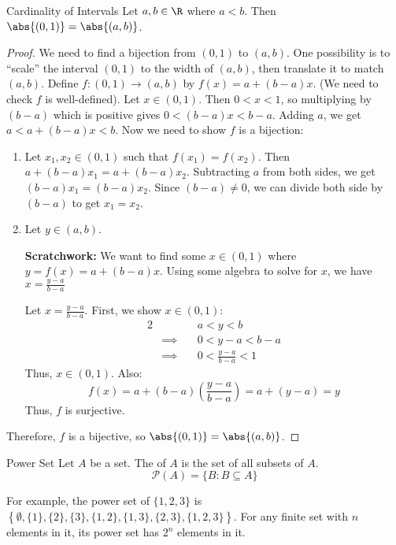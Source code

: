 \begin{exbox}{Cardinality of Intervals}{}
    Let $a,b \in \R$ where $a < b$. Then $\abs{(0,1)} = \abs{(a,b)}$.
    \tcblower
    \begin{proof}
        We need to find a bijection from $(0,1)$ to $(a,b)$. One possibility is to ``scale'' the interval $(0,1)$ to the width of $(a,b)$, then translate it to match $(a,b)$. Define $f : (0,1) \to (a,b)$ by $f(x) = a + (b-a)x$. (We need to check $f$ is well-defined). Let $x \in (0,1)$. Then $0<x<1$, so multiplying by $(b-a)$ which is positive gives $0 < (b-a)x < b-a$. Adding $a$, we get $a < a+(b-a)x < b$. Now we need to show $f$ is a bijection:
        \begin{enumerate}
            \item Let $x_1, x_2 \in (0,1)$ such that $f(x_1) = f(x_2)$. Then $a + (b-a)x_1 = a+ (b-a)x_2$. Subtracting $a$ from both sides, we get $(b-a)x_1 = (b-a)x_2$. Since $(b-a) \neq 0$, we can divide both side by $(b-a)$ to get $x_1 = x_2$.
            \item Let $y \in (a,b)$.
            \begin{notebox}
                \textbf{Scratchwork:} We want to find some $x \in (0,1)$ where $y = f(x) = a + (b-a)x$. Using some algebra to solve for $x$, we have $x = \frac{y-a}{b-a}$
            \end{notebox}
            Let $x = \frac{y-a}{b-a}$. First, we show $x \in (0,1)$:
            \begin{alignat*}{2}
                && a < y < b \\
                & \implies \quad & 0 < y-a < b-a \\
                & \implies & 0 < \frac{y-a}{b-a} < 1
            \end{alignat*}
            Thus, $x \in (0,1)$. Also:
            \[ f(x) = a + (b-a) \left( \frac{y-a}{b-a} \right) = a + (y-a) = y \]
            Thus, $f$ is surjective.
        \end{enumerate}
        Therefore, $f$ is a bijective, so $\abs{(0,1)} = \abs{(a,b)}$.
    \end{proof}
\end{exbox}

\begin{dfnbox}{Power Set}{}
    Let $A$ be a set. The  of $A$ is the set of all subsets of $A$.
    \tcblower
    \[ \mathcal{P}(A) = \{ B : B \subseteq A \} \]
\end{dfnbox}

For example, the power set of $\{1,2,3\}$ is $\left\{\emptyset, \{1\}, \{2\}, \{3\}, \{1,2\}, \{1,3\}, \{2,3\}, \{1,2,3\} \right\}$. For any finite set with $n$ elements in it, its power set has $2^n$ elements in it.

